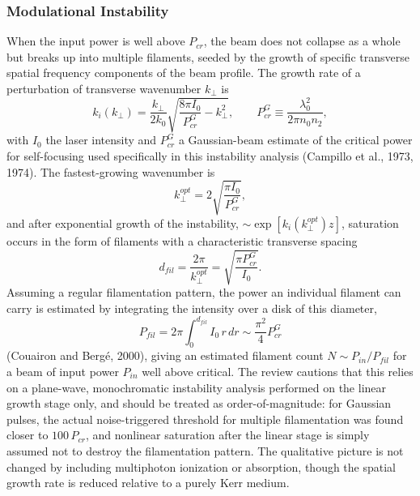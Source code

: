 \documentclass[11pt,a4paper]{article}
\begin{document}
\subsubsection{Modulational Instability}
When the input power is well above $P_{cr}$, the beam does not collapse as a whole but breaks up into multiple filaments, seeded by the growth of specific transverse spatial frequency components of the beam profile. The growth rate of a perturbation of transverse wavenumber $k_\perp$ is
\begin{equation}
k_i(k_\perp) = \frac{k_\perp}{2k_0}\sqrt{\frac{8\pi I_0}{P_{cr}^G} - k_\perp^2},
\qquad P_{cr}^G \equiv \frac{\lambda_0^2}{2\pi n_0n_2},
\end{equation}
with $I_0$ the laser intensity and $P_{cr}^G$ a Gaussian-beam estimate of the critical power for self-focusing used specifically in this instability analysis (Campillo et al., 1973, 1974). The fastest-growing wavenumber is
\begin{equation}
k_\perp^{opt} = 2\sqrt{\frac{\pi I_0}{P_{cr}^G}},
\end{equation}
and after exponential growth of the instability, $\sim\exp[k_i(k_\perp^{opt})z]$, saturation occurs in the form of filaments with a characteristic transverse spacing
\begin{equation}
d_{fil} = \frac{2\pi}{k_\perp^{opt}} = \sqrt{\frac{\pi P_{cr}^G}{I_0}}.
\end{equation}
Assuming a regular filamentation pattern, the power an individual filament can carry is estimated by integrating the intensity over a disk of this diameter,
\begin{equation}
P_{fil} = 2\pi\int_0^{d_{fil}} I_0\,r\,dr \sim \frac{\pi^2}{4}P_{cr}^G
\end{equation}
(Couairon and Bergé, 2000), giving an estimated filament count $N\sim P_{in}/P_{fil}$ for a beam of input power $P_{in}$ well above critical. The review cautions that this relies on a plane-wave, monochromatic instability analysis performed on the linear growth stage only, and should be treated as order-of-magnitude: for Gaussian pulses, the actual noise-triggered threshold for multiple filamentation was found closer to $100\,P_{cr}$, and nonlinear saturation after the linear stage is simply assumed not to destroy the filamentation pattern. The qualitative picture is not changed by including multiphoton ionization or absorption, though the spatial growth rate is reduced relative to a purely Kerr medium.
\end{document}
